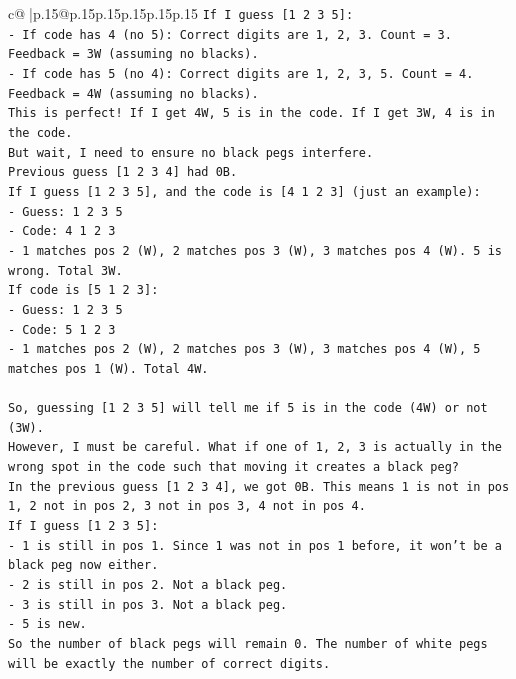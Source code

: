 \documentclass{article}
\begin{document}
{\begin{supertabular}{c@{$\;$}|p{.15\linewidth}@{}p{.15\linewidth}p{.15\linewidth}p{.15\linewidth}p{.15\linewidth}p{.15\linewidth}}
{{{\texttt{If I guess {[}1 2 3 5{]}:} \\
\texttt{{-} If code has 4 (no 5): Correct digits are 1, 2, 3. Count = 3. Feedback = 3W (assuming no blacks).} \\
\texttt{{-} If code has 5 (no 4): Correct digits are 1, 2, 3, 5. Count = 4. Feedback = 4W (assuming no blacks).} \\
\texttt{This is perfect! If I get 4W, 5 is in the code. If I get 3W, 4 is in the code.} \\
\texttt{But wait, I need to ensure no black pegs interfere.} \\
\texttt{Previous guess {[}1 2 3 4{]} had 0B.} \\
\texttt{If I guess {[}1 2 3 5{]}, and the code is {[}4 1 2 3{]} (just an example):} \\
\texttt{{-} Guess: 1 2 3 5} \\
\texttt{{-} Code: 4 1 2 3} \\
\texttt{{-} 1 matches pos 2 (W), 2 matches pos 3 (W), 3 matches pos 4 (W). 5 is wrong. Total 3W.} \\
\texttt{If code is {[}5 1 2 3{]}:} \\
\texttt{{-} Guess: 1 2 3 5} \\
\texttt{{-} Code: 5 1 2 3} \\
\texttt{{-} 1 matches pos 2 (W), 2 matches pos 3 (W), 3 matches pos 4 (W), 5 matches pos 1 (W). Total 4W.} \\
\\ 
\texttt{So, guessing {[}1 2 3 5{]} will tell me if 5 is in the code (4W) or not (3W).} \\
\texttt{However, I must be careful. What if one of 1, 2, 3 is actually in the wrong spot in the code such that moving it creates a black peg?} \\
\texttt{In the previous guess {[}1 2 3 4{]}, we got 0B. This means 1 is not in pos 1, 2 not in pos 2, 3 not in pos 3, 4 not in pos 4.} \\
\texttt{If I guess {[}1 2 3 5{]}:} \\
\texttt{{-} 1 is still in pos 1. Since 1 was not in pos 1 before, it won't be a black peg now either.} \\
\texttt{{-} 2 is still in pos 2. Not a black peg.} \\
\texttt{{-} 3 is still in pos 3. Not a black peg.} \\
\texttt{{-} 5 is new.} \\
\texttt{So the number of black pegs will remain 0. The number of white pegs will be exactly the number of correct digits.} \\
}}}
\end{supertabular}}
\end{document}
